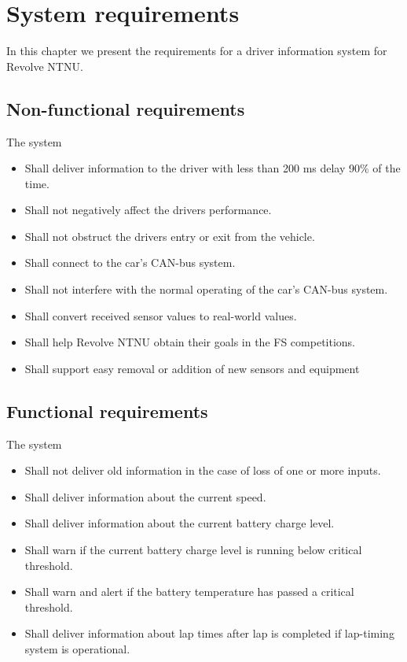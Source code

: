 \chapter{System requirements}
\label{requirements}

In this chapter we present the requirements for a driver information system for Revolve NTNU.

\section{Non-functional requirements} %

The system
\begin{itemize}
	\item Shall deliver information to the driver with less than 200 ms delay 90\% of the time.
	\item Shall not negatively affect the drivers performance.
	\item Shall not obstruct the drivers entry or exit from the vehicle.
	\item Shall connect to the car's CAN-bus system.
	\item Shall not interfere with the normal operating of the car's CAN-bus system.
	\item Shall convert received sensor values to real-world values.
	\item Shall help Revolve NTNU obtain their goals in the FS competitions.
	\item Shall support easy removal or addition of new sensors and equipment
\end{itemize}

\section{Functional requirements} %
The system
\begin{itemize}
	\item Shall not deliver old information in the case of loss of one or more inputs.
	\item Shall deliver information about the current speed.
	\item Shall deliver information about the current battery charge level.
	\item Shall warn if the current battery charge level is running below critical threshold\footnotemark[1].
	\item Shall warn and alert if the battery temperature has passed a critical threshold\footnotemark[1].
	\item Shall deliver information about lap times after lap is completed if lap-timing system is operational.
\end{itemize}

